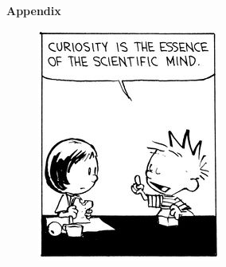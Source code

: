 \cleardoublepage\pagestyle{empty}
\begin{center}
	\vspace*{10mm}
     
	\huge \textbf{Appendix}

	\vspace{10mm}
\begin{figure}[th]
	\centering
	\includegraphics[width=0.5\linewidth]{./90abea0a347b72828c77b22bcbd45225--science-classroom-science-humor}
\end{figure}
\vspace{10mm}



\end{center}

\cleardoublepage
\setlength{\topmargin}{0mm}
\normalsize%
